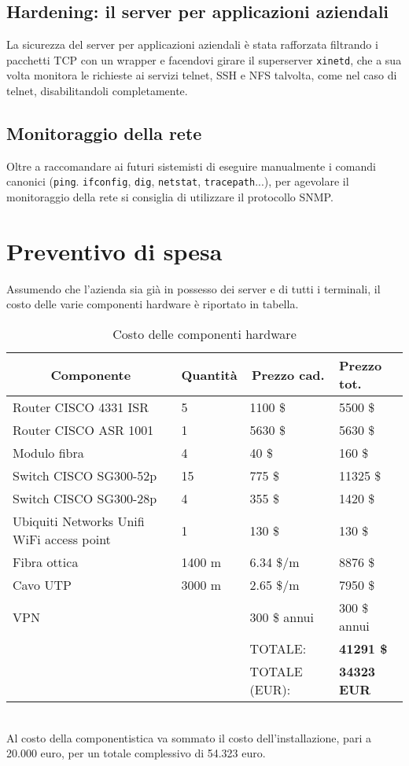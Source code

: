 \documentclass[a4paper,11pt]{article}
\def\code#1{\texttt{#1}}
\begin{document}
\subsection{Hardening: il server per applicazioni aziendali}
La sicurezza del server per applicazioni aziendali è stata rafforzata filtrando i pacchetti TCP con un wrapper e facendovi girare il superserver \code{xinetd}, che a sua volta monitora le richieste ai servizi telnet, SSH e NFS talvolta, come nel caso di telnet, disabilitandoli completamente.
\subsection{Monitoraggio della rete}
Oltre a raccomandare ai futuri sistemisti di eseguire manualmente i comandi canonici (\code{ping}. \code{ifconfig}, \code{dig}, \code{netstat}, \code{tracepath}...), per agevolare il monitoraggio della rete si consiglia di utilizzare il protocollo SNMP.
\newpage
\section{Preventivo di spesa}
Assumendo che l'azienda sia già in possesso dei server e di tutti i terminali, il costo delle varie componenti hardware è riportato in tabella.
\begin{table}[H]
\centering
\label{costo componentistica}
\begin{tabular}{ll|l|l|}
\hline
\multicolumn{1}{|c|}{\textbf{Componente}} & \multicolumn{1}{c|}{\textbf{Quantità}} & \multicolumn{1}{c|}{\textbf{Prezzo cad.}} & \textbf{Prezzo tot.} \\ \hline
\multicolumn{1}{|l|}{Router CISCO 4331 ISR} & 5 & 1100 \$ & 5500 \$ \\ \hline
\multicolumn{1}{|l|}{Router CISCO ASR 1001} & 1 & 5630 \$ & 5630 \$ \\ \hline
\multicolumn{1}{|l|}{Modulo fibra} & 4 & 40 \$ & 160 \$ \\ \hline
\multicolumn{1}{|l|}{Switch CISCO SG300-52p} & 15 & 775 \$ & 11325 \$ \\ \hline
\multicolumn{1}{|l|}{Switch CISCO SG300-28p} & 4 & 355 \$ & 1420 \$ \\ \hline
\multicolumn{1}{|l|}{Ubiquiti Networks Unifi WiFi access point} & 1 & 130 \$ & 130 \$ \\ \hline
\multicolumn{1}{|l|}{Fibra ottica} & 1400 m & 6.34 \$/m & 8876 \$ \\ \hline
\multicolumn{1}{|l|}{Cavo UTP} & 3000 m & 2.65 \$/m & 7950 \$ \\ \hline
\multicolumn{1}{|l|}{VPN} &  & 300 \$ annui & 300 \$ annui \\ \hline
 &  & TOTALE: & \textbf{41291 \$} \\ \cline{3-4} 
 &  & TOTALE (EUR): & \textbf{34323 EUR} \\ \cline{3-4} 
\end{tabular}
\caption{Costo delle componenti hardware}
\end{table}
\ \\Al costo della componentistica va sommato il costo dell'installazione, pari a 20.000 euro, per un totale complessivo di 54.323 euro.
\end{document}
